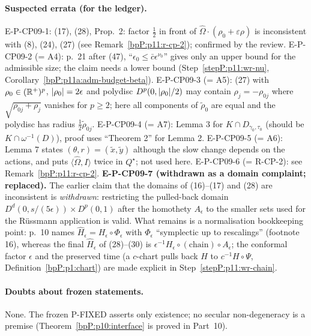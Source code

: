 \paragraph{Suspected errata (for the ledger).} E-P-CP09-1: (17), (28), Prop.~2: factor $\frac12$ in front of $\hat\Omega\cdot(\rho_0+\varepsilon\rho)$ is inconsistent with (8), (24), (27) (see Remark~\ref{bpP:p11:r-cp-2}); confirmed by the review. E-P-CP09-2 (= A4): p.~21 after (47), ``$\epsilon_0\le\bar c\epsilon^{\nu_0}$'' gives only an upper bound for the admissible size; the claim needs a lower bound (Step~\ref{stepP:p11:wr-nu}, Corollary~\ref{bpP:p11a:adm-budget-beta}). E-P-CP09-3 (= A5): (27) with $\rho_0\in(\mathbb{R}^+)^p$, $\lvert \rho_0\rvert=2\epsilon$ and polydisc $D^p(0,\lvert \rho_0\rvert/2)$ may contain $\rho_j=-\rho_{0j}$ where $\sqrt{\rho_{0j}+\rho_j}$ vanishes for $p\ge2$; here all components of $\tilde\rho_0$ are equal and the polydisc has radius $\frac12\tilde\rho_{0j}$. E-P-CP09-4 (= A7): Lemma 3 for $K\cap D_{\gamma_0,\tau_0}$ (should be $K\cap\omega^{-1}(D)$), proof uses ``Theorem 2'' for Lemma 2. E-P-CP09-5 (= A6): Lemma 7 states $(\theta,r)=(\tilde x,\tilde y)$ although the slow change depends on the actions, and puts $\langle\hat\Omega,I\rangle$ twice in $Q^\star$; not used here. E-P-CP09-6 (= R-CP-2): see Remark~\ref{bpP:p11:r-cp-2}. \textbf{E-P-CP09-7 (withdrawn as a domain complaint; replaced).} The earlier claim that the domains of (16)--(17) and (28) are inconsistent is \emph{withdrawn}: restricting the pulled-back domain $D^d(0,s/(5\epsilon))\times D^p(0,1)$ after the homothety $A_\epsilon$ to the smaller sets used for the Rüssmann application is valid. What remains is a normalisation bookkeeping point: p.~10 names $\hat H_\epsilon=H_\epsilon\circ\Phi_\epsilon$ with $\Phi_\epsilon$ ``symplectic up to rescalings'' (footnote 16), whereas the final $\hat H_\epsilon$ of (28)--(30) is $\epsilon^{-1}H_\epsilon\circ(\text{chain})\circ A_\epsilon$; the conformal factor $\epsilon$ and the preserved time (a $c$-chart pulls back $H$ to $c^{-1}H\circ\Psi$, Definition~\ref{bpP:p1:chart}) are made explicit in Step~\ref{stepP:p11:wr-chain}.

\paragraph{Doubts about frozen statements.} None. The frozen P-FIXED asserts only existence; no secular non-degeneracy is a premise (Theorem~\ref{bpP:p10:interface} is proved in Part~10).

